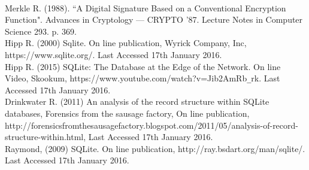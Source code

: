 \begin{thebibliography}{0}
\\
Merkle R. (1988). ``A Digital Signature Based on a Conventional Encryption Function". Advances in Cryptology — CRYPTO '87. Lecture Notes in Computer Science 293. p. 369.
\\
Hipp R. (2000) Sqlite. On line publication, Wyrick Company, Inc, https://www.sqlite.org/. Last Accessed 17th January 2016.
\\
Hipp R. (2015) SQLite: The Database at the Edge of the Network. On line Video, Skookum, https://www.youtube.com/watch?v=Jib2AmRb\verb|_|rk. Last Accessed 17th January 2016.
\\
Drinkwater R. (2011) An analysis of the record structure within SQLite databases, Forensics from the sausage factory, On line publication, http://forensicsfromthesausagefactory.blogspot.com/2011/05/analysis-of-record- \newline structure-within.html, Last Accessed 17th January 2016.
\\
Raymond, (2009) SQLite.  On line publication, http://ray.bsdart.org/man/sqlite/. Last Accessed 17th January 2016.

\end{thebibliography}